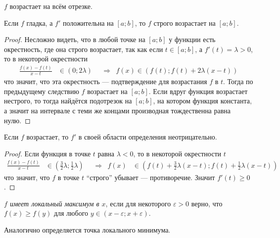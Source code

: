 \documentclass[12pt,a4paper]{article}
\begin{document}
    \begin{corollary}
        $f$ возрастает на всём отрезке.
    \end{corollary}

    \begin{theorem}
        Если $f$ гладка, а $f'$ положительна на $[a; b]$, то $f$ строго возрастает на $[a; b]$.
    \end{theorem}

    \begin{proof}
        Несложно видеть, что в любой точке на $[a; b]$ у функции есть окрестность, где она строго возрастает, так как если $t \in [a; b]$, а $f'(t) = \lambda > 0$, то в некоторой окрестности
        \begin{align*}
            \frac{f(x) - f(t)}{x - t} &\in (0; 2\lambda)&
            &\Longrightarrow&
            f(x) \in (f(t); f(t) + 2\lambda(x-t))
        \end{align*}
        что значит, что эта окрестность --- подтверждение для возрастания $f$ в $t$. Тогда по предыдущему следствию $f$ возрастает на $[a; b]$. Если вдруг функция возрастает нестрого, то тогда найдётся подотрезок на $[a;b]$, на котором функция константа, а значит на интервале с теми же концами производная тождественна равна нулю.
    \end{proof}

    \begin{theorem}
        Если $f$ возрастает, то $f'$ в своей области определения неотрицательно.
    \end{theorem}

    \begin{proof}
        Если функция в точке $t$ равна $\lambda < 0$, то в некоторой окрестности $t$
        \begin{align*}
            \frac{f(x)-f(t)}{x-t} &\in \left(\frac{3}{2}\lambda; \frac{1}{2}\lambda\right)&
            &\Longrightarrow&
            f(x) &\in \left(f(t) + \frac{3}{2}\lambda(x-t); f(t) + \frac{1}{2}\lambda(x-t)\right)
        \end{align*}
        что значит, что $f$ в точке $t$ ``строго'' убывает --- противоречие. Значит $f'(t) \geqslant 0$.
    \end{proof}

    \begin{definition}
        \emph{$f$ имеет локальный максимум в $x$}, если для некоторого $\varepsilon > 0$ верно, что $f(x) \geqslant f(y)$ для любого $y \in (x - \varepsilon; x + \varepsilon)$.

        Аналогично определяется точка локального минимума.
    \end{definition}
\end{document}
